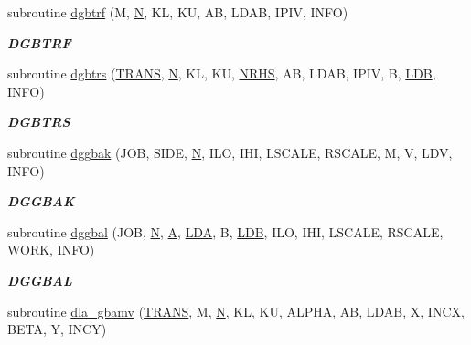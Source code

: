 \begin{DoxyCompactItemize}
subroutine \hyperlink{group__doubleGBcomputational_ga7fc91ba3f250ad3844eba25d59f5d7be}{dgbtrf} (M, \hyperlink{polmisc_8c_a0240ac851181b84ac374872dc5434ee4}{N}, K\+L, K\+U, A\+B, L\+D\+A\+B, I\+P\+I\+V, I\+N\+F\+O)
\begin{DoxyCompactList}\small\item\em {\bfseries D\+G\+B\+T\+R\+F} \end{DoxyCompactList}\item 
subroutine \hyperlink{group__doubleGBcomputational_ga37ca5bf29c33e026922c06b3bf188513}{dgbtrs} (\hyperlink{superlu__enum__consts_8h_a0c4e17b2d5cea33f9991ccc6a6678d62a1f61e3015bfe0f0c2c3fda4c5a0cdf58}{T\+R\+A\+N\+S}, \hyperlink{polmisc_8c_a0240ac851181b84ac374872dc5434ee4}{N}, K\+L, K\+U, \hyperlink{example__user_8c_aa0138da002ce2a90360df2f521eb3198}{N\+R\+H\+S}, A\+B, L\+D\+A\+B, I\+P\+I\+V, B, \hyperlink{example__user_8c_a50e90a7104df172b5a89a06c47fcca04}{L\+D\+B}, I\+N\+F\+O)
\begin{DoxyCompactList}\small\item\em {\bfseries D\+G\+B\+T\+R\+S} \end{DoxyCompactList}\item 
subroutine \hyperlink{group__doubleGBcomputational_ga7b29af57a3c8be5f39ab997cb14c7eb6}{dggbak} (J\+O\+B, S\+I\+D\+E, \hyperlink{polmisc_8c_a0240ac851181b84ac374872dc5434ee4}{N}, I\+L\+O, I\+H\+I, L\+S\+C\+A\+L\+E, R\+S\+C\+A\+L\+E, M, V, L\+D\+V, I\+N\+F\+O)
\begin{DoxyCompactList}\small\item\em {\bfseries D\+G\+G\+B\+A\+K} \end{DoxyCompactList}\item 
subroutine \hyperlink{group__doubleGBcomputational_gab41eb79b2fdb2937f01bc8806d8ff4b1}{dggbal} (J\+O\+B, \hyperlink{polmisc_8c_a0240ac851181b84ac374872dc5434ee4}{N}, \hyperlink{classA}{A}, \hyperlink{example__user_8c_ae946da542ce0db94dced19b2ecefd1aa}{L\+D\+A}, B, \hyperlink{example__user_8c_a50e90a7104df172b5a89a06c47fcca04}{L\+D\+B}, I\+L\+O, I\+H\+I, L\+S\+C\+A\+L\+E, R\+S\+C\+A\+L\+E, W\+O\+R\+K, I\+N\+F\+O)
\begin{DoxyCompactList}\small\item\em {\bfseries D\+G\+G\+B\+A\+L} \end{DoxyCompactList}\item 
subroutine \hyperlink{group__doubleGBcomputational_ga56d796bfc96e72878e2c62d5aa1ab54b}{dla\+\_\+gbamv} (\hyperlink{superlu__enum__consts_8h_a0c4e17b2d5cea33f9991ccc6a6678d62a1f61e3015bfe0f0c2c3fda4c5a0cdf58}{T\+R\+A\+N\+S}, M, \hyperlink{polmisc_8c_a0240ac851181b84ac374872dc5434ee4}{N}, K\+L, K\+U, A\+L\+P\+H\+A, A\+B, L\+D\+A\+B, X, I\+N\+C\+X, B\+E\+T\+A, Y, I\+N\+C\+Y)

\end{DoxyCompactItemize}
